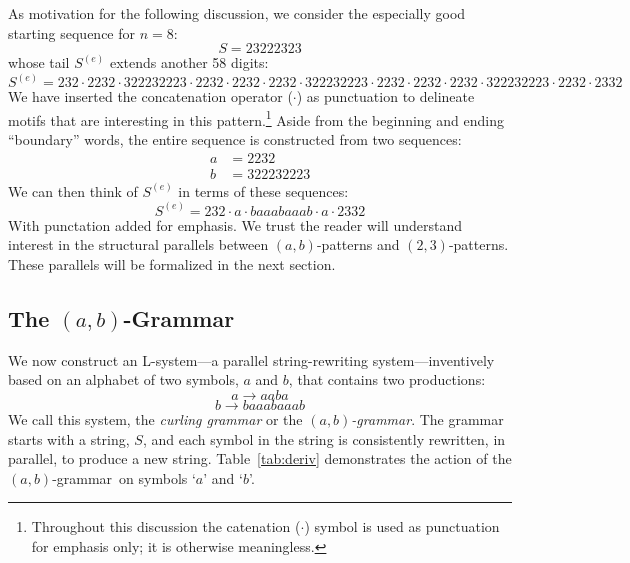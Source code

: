\documentclass[11pt]{article}
\def\emph#1{{\em #1\/}}
\def\term#1{\emph{#1}}
\def\ni{\noindent}
\def\ab{$(a,b)$}
\def\twth{$(2,3)$}
\def\abg{\ab-grammar}
\def\q#1{`$#1$'}
\begin{document}
As motivation for the following discussion, we consider the 
especially good starting sequence for $n=8$:
$$S=2 3 2 2 2 3 2 3$$
\ni whose tail $S^{(e)}$ extends another 58 digits:
$$S^{(e)}=2 3 2 \cdot 2 2 3 2 \cdot 3 2 2 2 3 2 2 2 3\cdot2 2 3 2\cdot2 2 3 2\cdot2 2 3 2\cdot3 2 2 2 3 2 2 2 3\cdot 2 2 3 2 \cdot 2 2 3 2\cdot 2 2 3 2\cdot 3 2 2 2 3 2 2 2 3\cdot 2 2 3 2\cdot 2 3 3 2$$
\ni We have inserted the concatenation operator ($\cdot$) as punctuation to delineate motifs that are interesting in this pattern.\footnote{Throughout this discussion the catenation ($\cdot$) symbol
is used as punctuation for emphasis only; it is otherwise meaningless.}  Aside from the beginning and ending ``boundary'' words, the entire sequence is constructed from two sequences:
\begin{align*}
a&=2 2 3 2\\
b&=3 2 2 2 3 2 2 2 3
\end{align*}
\ni We can then think of $S^{(e)}$ in terms of these sequences:
$$S^{(e)}=232\cdot a\cdot b a a a b a a a b\cdot a \cdot 2332$$
With punctation added for emphasis.  We trust the reader will understand interest in the structural parallels between \ab-patterns and \twth-patterns.
These parallels will be formalized in the next section.

\subsection{The \ab-Grammar}

We now construct an L-system---a parallel string-rewriting system\cite{Rz76}---inventively based on
an alphabet of two symbols, $a$ and $b$, that contains two productions:
$$a\rightarrow a a b a$$
$$b\rightarrow b a a a b a a a b$$
\ni We call this system, the \term{curling grammar} or the \term{\abg}.  The grammar starts with a string, $S$, and each symbol in the string
is consistently rewritten, in parallel, to produce a new string.  Table~\ref{tab:deriv}
demonstrates the action of the \abg\ on symbols \q{a} and \q{b}.
\end{document}
